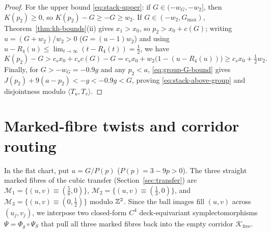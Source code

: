 \begin{proof}
For the upper bound \eqref{eq:stack-upper}: if $G\in(-w_G,-w_2]$, then $K(p_2)\ge0$, so $K(p_2)-G\ge-G\ge w_2$. If
$G\in(-w_2,G_{\max})$, Theorem~\ref{thm:kh-bounds}(ii) gives $x_1>x_0$, so $p_2>x_0+c(G)$; writing $u=(G+w_2)/w_2>0$
($G=(u-1)w_2$) and using $u-R_4(u)\le\lim_{t\to\infty}(t-R_4(t))=\frac12$, we have
\[
 K(p_2)-G > c_sx_0 + c_sc(G) - G = c_sx_0 + w_2\bigl(1-(u-R_4(u))\bigr) \ge c_sx_0 + \tfrac12 w_2.
\]
Finally, for $G>-w_G=-0.9g$ and any $p_2<a$, \eqref{eq:group-G-bound} gives $J(p_2)+9(a-p_2)<-g<-0.9g<G$, proving
\eqref{eq:stack-above-group} and disjointness modulo $\langle T_u,T_v\rangle$.
\end{proof}

\section{Marked-fibre twists and corridor routing}\label{sec:twists}

In the flat chart, put $u=G/P(p)$ ($P(p)=3-9p>0$). The three straight marked fibres of the cubic transfer (Section~\ref{sec:transfer})
are $\mathcal M_1=\{(u,v)\equiv(\frac56,0)\}$, $\mathcal M_2=\{(u,v)\equiv(\frac13,0)\}$, and
$\mathcal M_3=\{(u,v)\equiv(0,\frac12)\}$ modulo $\mathbb{Z}^2$. Since the ball images fill $(u,v)$ across $(u_j,v_j)$, we
interpose two closed-form $C^4$ deck-equivariant symplectomorphisms $\Psi=\Phi_g\circ\Psi_S$ that pull all three
marked fibres back into the empty corridor $\mathcal K_{\mathrm{free}}$.

